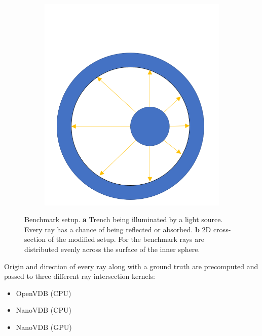 \begin{figure}[H]
\begin{subfigure}{0.35\textwidth}
	\end{subfigure}
	\begin{subfigure}{0.35\textwidth}
		\includegraphics[width=1\linewidth]{res/benchmark_setup.png}
		\caption{}
	\end{subfigure}

	\caption{Benchmark setup. \textbf{a} Trench being illuminated by a light source. Every ray has a chance of being reflected or absorbed.
		\textbf{b} 2D cross-section of the modified setup. For the benchmark rays are distributed evenly across the surface of the inner sphere.}
	\label{fig:benchmark_setup}
\end{figure}


Origin and direction of every ray along with a ground truth are precomputed and passed to three different ray intersection kernels:

\begin{itemize}
	\item OpenVDB (CPU)
	\item NanoVDB (CPU)
	\item NanoVDB (GPU)
\end{itemize}

